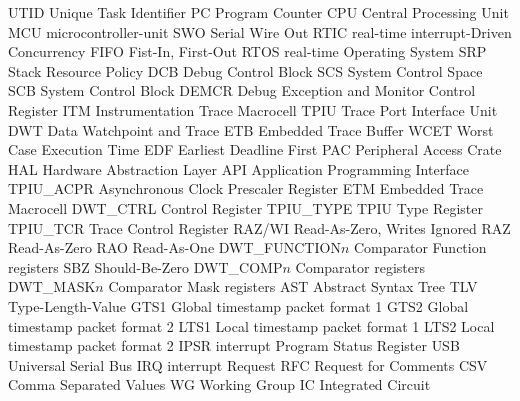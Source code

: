  {UTID} {{Unique Task Identifier}}
 {PC} {{Program Counter}}
 {CPU} {{Central Processing Unit}}
 {MCU} {{\Gls{microcontroller-unit}}}
 {SWO} {{Serial Wire Out}}
 {RTIC} {{\Gls{real-time} \Gls{interrupt}-Driven Concurrency}}
 {FIFO} {{Fist-In, First-Out}}
 {RTOS} {{\Gls{real-time} Operating System}}
 {SRP} {{Stack Resource Policy}}
 {DCB} {{Debug Control Block}}
 {SCS} {{System Control Space}}
 {SCB} {{System Control Block}}
 {DEMCR} {{Debug Exception and Monitor Control Register}}
 {ITM} {{Instrumentation Trace Macrocell}}
 {TPIU} {{Trace Port Interface Unit}}
 {DWT} {{Data Watchpoint and Trace}}
 {ETB} {{Embedded Trace Buffer}}
 {WCET} {{Worst Case Execution Time}}
 {EDF} {{Earliest Deadline First}}
 {PAC} {{Peripheral Access Crate}}
 {HAL} {{Hardware Abstraction Layer}}
 {API} {{Application Programming Interface}}
 {TPIU\_ACPR} {{Asynchronous Clock Prescaler Register}}
 {ETM} {{Embedded Trace Macrocell}}
 {DWT\_CTRL} {{Control Register}}
 {TPIU\_TYPE} {{TPIU Type Register}}
 {TPIU\_TCR} {{Trace Control Register}}
 {RAZ/WI} {{Read-As-Zero, Writes Ignored}}
 {RAZ} {{Read-As-Zero}}
 {RAO} {{Read-As-One}}
 {DWT\_FUNCTION$n$} {{Comparator Function registers}}
 {SBZ} {{Should-Be-Zero}}
 {DWT\_COMP$n$} {{Comparator registers}}
 {DWT\_MASK$n$} {{Comparator Mask registers}}
 {AST} {{Abstract Syntax Tree}}
 {TLV} {{Type-Length-Value}}
 {GTS1} {{Global timestamp packet format 1}}
 {GTS2} {{Global timestamp packet format 2}}
 {LTS1} {{Local timestamp packet format 1}}
 {LTS2} {{Local timestamp packet format 2}}
 {IPSR} {{\Gls{interrupt} Program Status Register}}
 {USB} {{Universal Serial Bus}}
 {IRQ} {{\Gls{interrupt} Request}}
 {RFC} {{Request for Comments}}
 {CSV} {{Comma Separated Values}}
 {WG} {{Working Group}}
 {IC} {{Integrated Circuit}}


